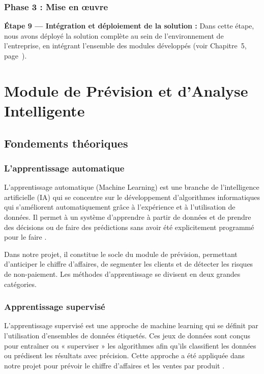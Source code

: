 \subsubsection*{Phase 3 : Mise en œuvre}

\textbf{Étape 9 --- Intégration et déploiement de la solution :}
Dans cette étape, nous avons déployé la solution complète au sein de
l'environnement de l'entreprise, en intégrant l'ensemble des modules développés
(voir Chapitre~5, page~\pageref{sec:ch5:impl}).

\newpage

\section{Module de Prévision et d'Analyse Intelligente}

\subsection{Fondements théoriques}

\subsubsection{L'apprentissage automatique}

L'apprentissage automatique (Machine Learning) est une branche de l'intelligence
artificielle (IA) qui se concentre sur le développement d'algorithmes informatiques
qui s'améliorent automatiquement grâce à l'expérience et à l'utilisation de données.
Il permet à un système d'apprendre à partir de données et de prendre des décisions
ou de faire des prédictions sans avoir été explicitement programmé pour le faire
\cite{datacamp_ml}.

Dans notre projet, il constitue le socle du module de prévision, permettant d'anticiper
le chiffre d'affaires, de segmenter les clients et de détecter les risques de non-paiement.
Les méthodes d'apprentissage se divisent en deux grandes catégories.

\subsubsection{Apprentissage supervisé}

L'apprentissage supervisé est une approche de machine learning qui se définit par
l'utilisation d'ensembles de données étiquetés. Ces jeux de données sont conçus pour
entraîner ou « superviser » les algorithmes afin qu'ils classifient les données ou
prédisent les résultats avec précision. Cette approche a été appliquée dans notre
projet pour prévoir le chiffre d'affaires et les ventes par produit \cite{ibm_supervised}.

